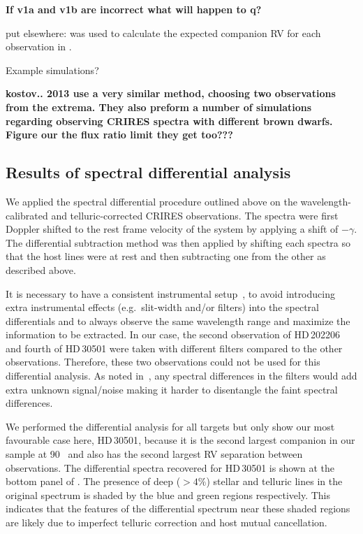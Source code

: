 \textbf{If v1a and v1b are incorrect what will happen to q?}

{\red{} put elsewhere:  was used to calculate the expected companion {RV} for each observation in .}

Example simulations?

\textbf{kostov.. 2013 use a very similar method, choosing two observations from the extrema. They also preform a number of simulations regarding observing CRIRES spectra with different brown dwarfs. Figure our the flux ratio limit they get too???}

\subsection{Results of spectral differential analysis}
\label{subsec:differential_results}

We applied the spectral differential procedure outlined above on the wavelength-calibrated and telluric-corrected {CRIRES} observations. The spectra were first Doppler shifted to the rest frame velocity of the system by applying a shift of \(-\gamma\). The differential subtraction method was then applied by shifting each spectra so that the host lines were at rest and then subtracting one from the other as described above.

It is necessary to have a consistent instrumental setup~\citet{ferluga_separating_1997}, to avoid introducing extra instrumental effects (e.g.\ slit-width and/or filters) into the spectral differentials and to always observe the same wavelength range and maximize the information to be extracted. In our case, the second observation of {HD\,202206} and fourth of {HD\,30501} were taken with different filters compared to the other observations. Therefore, these two observations could not be used for this differential analysis. As noted in~\citep{hadrava_disentangling_2009}, any spectral differences in the filters would add extra unknown signal/noise making it harder to disentangle the faint spectral differences.


We performed the differential analysis for all targets but only show our most favourable case here, {HD\,30501}, because it is the second largest companion in our sample at 90~\Mjup{} and also has the second largest {RV} separation between observations. The differential spectra recovered for {HD\,30501} is shown at the bottom panel of . The presence of deep (\(>4\%\)) stellar and telluric lines in the original spectrum is shaded by the blue and green regions respectively. This indicates that the features of the differential spectrum near these shaded regions are likely due to imperfect telluric correction and host mutual cancellation.

